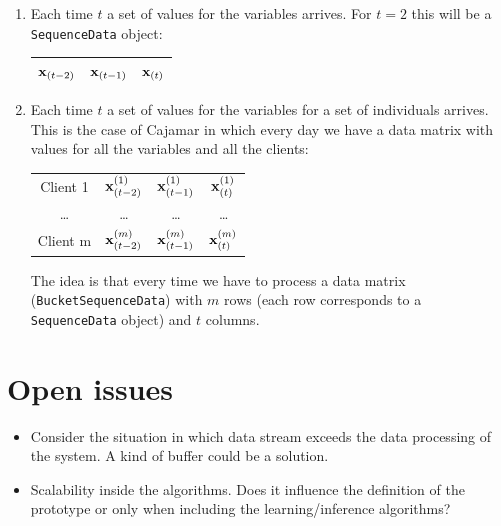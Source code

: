 \documentclass[a4paper,12pt]{article}
\begin{document}
\begin{enumerate}
\item Each time $t$ a set of values for the variables arrives. For $t=2$ this will be a \texttt{SequenceData} object:
	\begin{center}
	\begin{tabular}{|c|c|c|}
	\hline
	$\x_{(t-2)}$ & $\x_{(t-1)}$ & $\x_{(t)}$\\
	\hline
	\end{tabular}
	\end{center}
	
	 

\item Each time $t$ a set of values for the variables for a set of individuals arrives. This is the case of Cajamar in which every day we have a data matrix with values for all the variables and all the clients:

	\begin{center}
	\begin{tabular}{|c|c|c|c|}
	\hline
	Client 1  & $\x^{(1)}_{(t-2)}$ & $\x^{(1)}_{(t-1)}$ & $\x^{(1)}_{(t)}$\\
	\ldots      & \ldots  & \ldots  & \ldots \\
	Client m  & $\x^{(m)}_{(t-2)}$ & $\x^{(m)}_{(t-1)}$ & $\x^{(m)}_{(t)}$\\	\hline
	\end{tabular}
	\end{center}
	The idea is that every time we have to process a data matrix (\texttt{BucketSequenceData}) with $m$ rows (each row corresponds to a \texttt{SequenceData} object) and $t$ columns.
\end{enumerate}

\section{Open issues}

\begin{itemize}
\item Consider the situation in which data stream exceeds the data processing of the system. A kind of buffer could be a solution. 
\item Scalability inside the algorithms. Does it influence the definition of the prototype or only when including the learning/inference algorithms?
\end{itemize}

 
\end{document}
